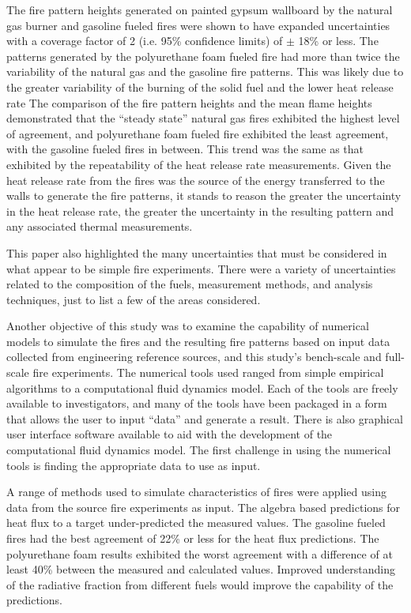 \documentclass[twoside]{uocthesis}
\begin{document}
{The fire pattern heights generated on painted gypsum wallboard by the natural gas burner and gasoline fueled fires were shown to have expanded uncertainties with a coverage factor of 2 (i.e. 95\% confidence limits) of $\pm$ 18\% or less. The patterns generated by the polyurethane foam fueled fire had more than twice the variability of the natural gas and the gasoline fire patterns.  This was likely due to the greater variability of the burning of the solid fuel and the lower heat release rate
The comparison of the fire pattern heights and the mean flame heights demonstrated that the “steady state” natural gas fires exhibited the highest level of agreement, and polyurethane foam fueled fire exhibited the least agreement, with the gasoline fueled fires in between.  This trend was the same as that exhibited by the repeatability of the heat release rate measurements.  Given the heat release rate from the fires was the source of the energy transferred to the walls to generate the fire patterns, it stands to reason the greater the uncertainty in the heat release rate, the greater the uncertainty in the resulting pattern and any associated thermal measurements.  

This paper also highlighted the many uncertainties that must be considered in what appear to be simple fire experiments. There were a variety of uncertainties related to the composition of the fuels, measurement methods, and analysis techniques, just to list a few of the areas considered. 

Another objective of this study was to examine the capability of numerical models to simulate the fires and the resulting fire patterns based on input data collected from engineering reference sources, and this study's bench-scale and full-scale fire experiments.  The numerical tools used ranged from simple empirical algorithms to a computational fluid dynamics model.  Each of the tools are freely available to investigators, and many of the tools have been packaged in a form that allows the user to input ``data'' and generate a result.  There is also graphical user interface software available to aid with the development of the computational fluid dynamics model.  The first challenge in using the numerical tools is finding the appropriate data to use as input.        

A range of methods used to simulate characteristics of fires were applied using data from the source fire experiments as input.  The algebra based predictions for heat flux to a target under-predicted the measured values.  The gasoline fueled fires had the best agreement of 22\% or less for the heat flux predictions.  The polyurethane foam results exhibited the worst agreement with a difference of at least 40\% between the measured and calculated values.  Improved understanding of the radiative fraction from different fuels would improve the capability of the predictions.  

}
\end{document}
